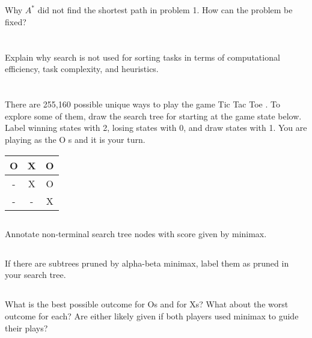 \documentclass[paper=a4, fontsize=11pt]{scrartcl}
\numberwithin{equation}{section} %
\numberwithin{figure}{section} %
\numberwithin{table}{section} %
\begin{document}

\subsection{}
Why $A^*$ did not find the shortest path in problem 1. How can the problem be fixed?

\section{}
Explain why search is not used for sorting tasks in terms of computational efficiency, task complexity, and
heuristics.

\section{}
There are 255,160 possible unique ways to play the game Tic Tac Toe . To explore some of them, draw the
search tree for starting at the game state below. Label winning states with 2, losing states with 0, and draw
states with 1. You are playing as the O s and it is your turn.

\begin{center}
 \begin{tabular}{|c|c|c|} 
 \hline
 O & X & O \\
 \hline
 - & X & O  \\ 
 \hline
 - & - & X \\
 \hline


\end{tabular}
\end{center}

\subsection{}
Annotate non-terminal search tree nodes with score given by minimax.

\subsection{}
If there are subtrees pruned by alpha-beta minimax, label them as pruned in your search tree.

\subsection{}
What is the best possible outcome for Os and for Xs? What about the worst outcome for each? Are either
likely given if both players used minimax to guide their plays?
\end{document}
